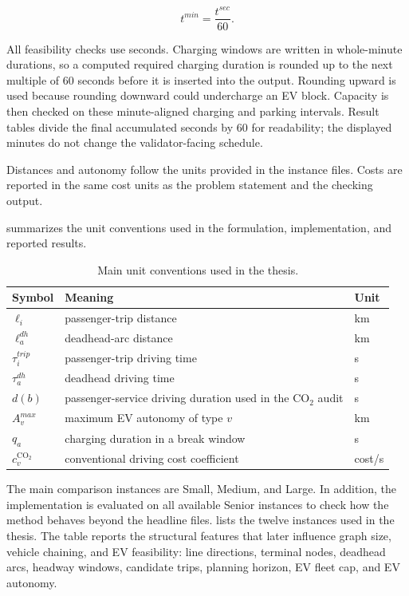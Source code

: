 \begin{equation}
t^{min}=\frac{t^{sec}}{60}.
\label{eq:unit-seconds-minutes}
\end{equation}

All feasibility checks use seconds. Charging windows are written in whole-minute
durations, so a computed required charging duration is rounded up to the next
multiple of 60 seconds before it is inserted into the output. Rounding upward is
used because rounding downward could undercharge an EV block. Capacity is then
checked on these minute-aligned charging and parking intervals. Result tables
divide the final accumulated seconds by 60 for readability; the displayed
minutes do not change the validator-facing schedule.

Distances and autonomy follow the units provided in the instance files. Costs
are reported in the same cost units as the problem statement and the checking
output.

 summarizes the unit conventions used in the
formulation, implementation, and reported results.

\begin{table}[htbp]
\centering
\small
\caption{Main unit conventions used in the thesis.}
\label{tab:unit-conventions}
\begin{tabular}{lll}
\toprule
Symbol & Meaning & Unit \\
\midrule
\(\ell_i\) & passenger-trip distance & km \\
\(\ell_a^{dh}\) & deadhead-arc distance & km \\
\(\tau_i^{trip}\) & passenger-trip driving time & s \\
\(\tau_a^{dh}\) & deadhead driving time & s \\
\(d(b)\) & passenger-service driving duration used in the CO\(_2\) audit & s \\
\(A_v^{max}\) & maximum EV autonomy of type \(v\) & km \\
\(q_a\) & charging duration in a break window & s \\
\(c_v^{\mathrm{CO}_2}\) & conventional driving cost coefficient & cost/s \\
\bottomrule
\end{tabular}
\end{table}
\FloatBarrier

The main comparison instances are Small, Medium, and Large. In addition, the
implementation is evaluated on all available Senior instances to check how the
method behaves beyond the headline files.  lists the twelve
instances used in the thesis. The table reports the structural features that
later influence graph size, vehicle chaining, and EV feasibility: line
directions, terminal nodes, deadhead arcs, headway windows, candidate trips,
planning horizon, EV fleet cap, and EV autonomy.

